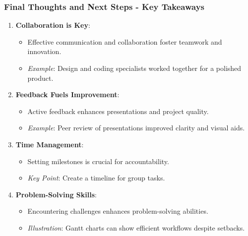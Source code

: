 \documentclass[aspectratio=169]{beamer}
\begin{document}
\begin{frame}[fragile]
    \frametitle{Final Thoughts and Next Steps - Key Takeaways}
    \begin{enumerate}
        \item \textbf{Collaboration is Key}:
            \begin{itemize}
                \item Effective communication and collaboration foster teamwork and innovation.
                \item \textit{Example}: Design and coding specialists worked together for a polished product.
            \end{itemize}
            
        \item \textbf{Feedback Fuels Improvement}:
            \begin{itemize}
                \item Active feedback enhances presentations and project quality.
                \item \textit{Example}: Peer review of presentations improved clarity and visual aids.
            \end{itemize}
    
        \item \textbf{Time Management}:
            \begin{itemize}
                \item Setting milestones is crucial for accountability.
                \item \textit{Key Point}: Create a timeline for group tasks.
            \end{itemize}
        
        \item \textbf{Problem-Solving Skills}:
            \begin{itemize}
                \item Encountering challenges enhances problem-solving abilities.
                \item \textit{Illustration}: Gantt charts can show efficient workflows despite setbacks.
            \end{itemize}
    \end{enumerate}
\end{frame}
\end{document}

